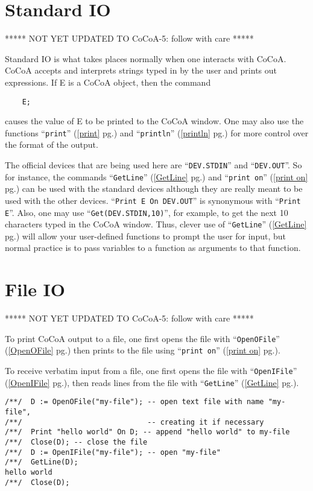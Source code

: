\documentclass[a4paper]{mybook}
\begin{document}
\section{Standard IO}
\label{Standard IO}

        
***** NOT YET UPDATED TO CoCoA-5: follow with care *****
\par 
Standard IO is what takes places normally when one interacts with
CoCoA.
CoCoA accepts and interprets strings typed in by the user and prints
out expressions.  If E is a CoCoA object, then the command
\begin{verbatim}
    E;
\end{verbatim}
causes the value of E to be printed to the CoCoA window.  One may also
use the functions ``\verb&print&'' (\ref{print} pg.\pageref{print}) and ``\verb&println&'' (\ref{println} pg.\pageref{println}) for more control over the
format of the output.
\par 
The official devices that are being used here are ``\verb&DEV.STDIN&'' and
``\verb&DEV.OUT&''. So for instance, the commands ``\verb&GetLine&'' (\ref{GetLine} pg.\pageref{GetLine}) and ``\verb&print on&'' (\ref{print on} pg.\pageref{print on}) can be
used with the standard devices although they are really meant to be
used with the other devices.  ``\verb&Print E On DEV.OUT&'' is synonymous with
``\verb&Print E&''.  Also, one may use ``\verb&Get(DEV.STDIN,10)&'', for example, to get
the next 10 characters typed in the CoCoA window.  Thus, clever use of
``\verb&GetLine&'' (\ref{GetLine} pg.\pageref{GetLine}) will allow your user-defined functions to prompt the user for
input, but normal practice is to pass variables to a function as
arguments to that function.


\section{File IO}
\label{File IO}

        
***** NOT YET UPDATED TO CoCoA-5: follow with care *****
\par 
To print CoCoA output to a file, one first opens the file
with ``\verb&OpenOFile&'' (\ref{OpenOFile} pg.\pageref{OpenOFile}) then prints to the file using ``\verb&print on&'' (\ref{print on} pg.\pageref{print on}).
\par 
To receive verbatim input from a file, one first opens the file with
``\verb&OpenIFile&'' (\ref{OpenIFile} pg.\pageref{OpenIFile}), then reads lines from the file with ``\verb&GetLine&'' (\ref{GetLine} pg.\pageref{GetLine}).
\begin{Verbatim}[label=example, rulecolor=\color{PineGreen}, frame=single]
/**/  D := OpenOFile("my-file"); -- open text file with name "my-file",
/**/                             -- creating it if necessary
/**/  Print "hello world" On D; -- append "hello world" to my-file
/**/  Close(D); -- close the file
/**/  D := OpenIFile("my-file"); -- open "my-file"
/**/  GetLine(D);
hello world
/**/  Close(D);
\end{Verbatim}
\end{document}

